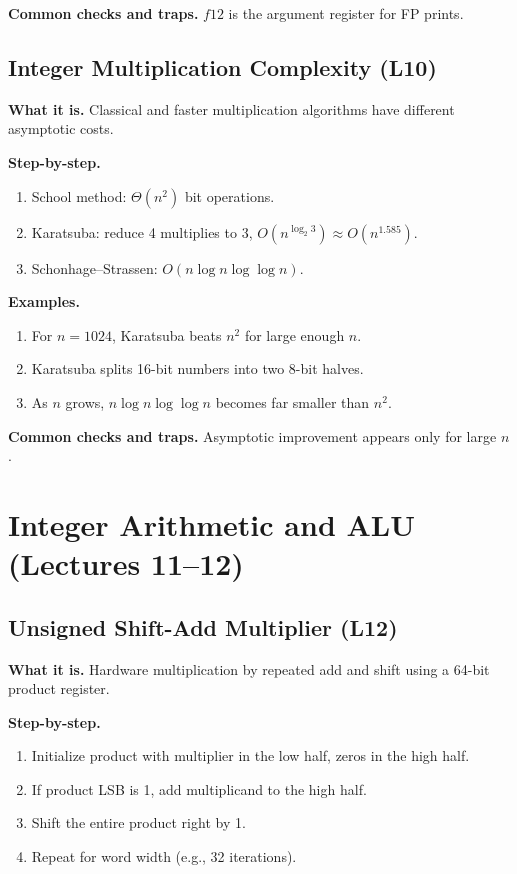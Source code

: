 \documentclass[11pt]{article}
\begin{document}
\textbf{Common checks and traps.} $f12$ is the argument register for FP prints.

\subsection{Integer Multiplication Complexity (L10)}
\textbf{What it is.} Classical and faster multiplication algorithms have different asymptotic costs.

\textbf{Step-by-step.}
\begin{enumerate}[leftmargin=*]
  \item School method: $\Theta(n^2)$ bit operations.
  \item Karatsuba: reduce 4 multiplies to 3, $O(n^{\log_2 3}) \approx O(n^{1.585})$.
  \item Schonhage--Strassen: $O(n \log n \log \log n)$.
\end{enumerate}

\textbf{Examples.}
\begin{enumerate}[leftmargin=*]
  \item For $n=1024$, Karatsuba beats $n^2$ for large enough $n$.
  \item Karatsuba splits 16-bit numbers into two 8-bit halves.
  \item As $n$ grows, $n \log n \log \log n$ becomes far smaller than $n^2$.
\end{enumerate}

\textbf{Common checks and traps.} Asymptotic improvement appears only for large $n$.

\section{Integer Arithmetic and ALU (Lectures 11--12)}

\subsection{Unsigned Shift-Add Multiplier (L12)}
\textbf{What it is.} Hardware multiplication by repeated add and shift using a 64-bit product register.

\textbf{Step-by-step.}
\begin{enumerate}[leftmargin=*]
  \item Initialize product with multiplier in the low half, zeros in the high half.
  \item If product LSB is 1, add multiplicand to the high half.
  \item Shift the entire product right by 1.
  \item Repeat for word width (e.g., 32 iterations).
\end{enumerate}
\end{document}
